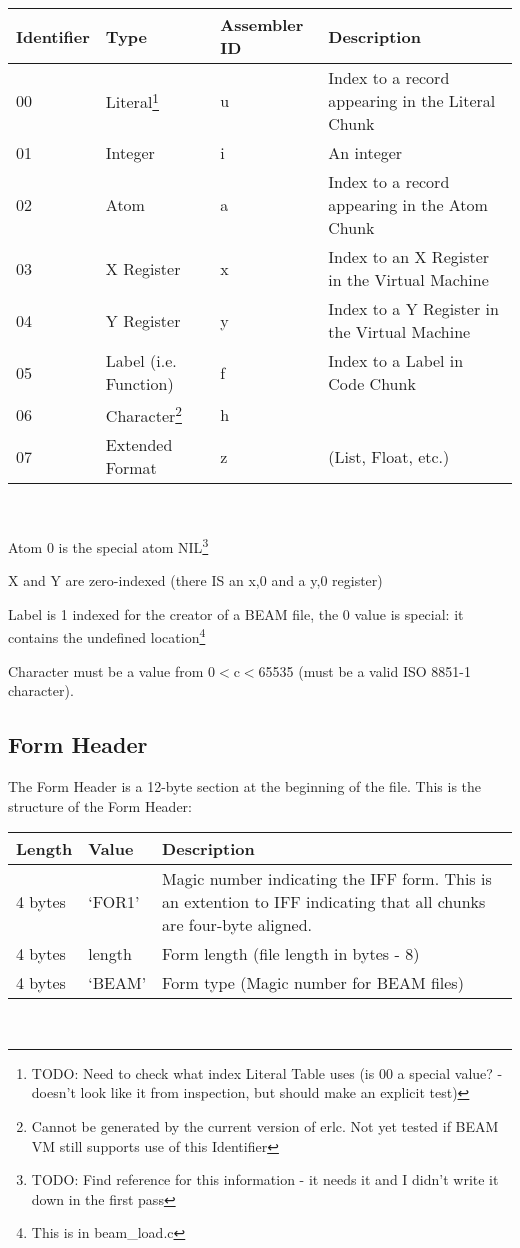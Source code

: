 \documentclass{article}
\begin{document}
\begin{savenotes}
\begin{tabular}{ |l|p{1in}|l|p{3in}| } \hline
Identifier & Type & Assembler ID & Description \\ \hline
00 & Literal\footnote{TODO: Need to check what index Literal Table uses (is 00 a special value? - doesn't look like it from inspection, but should make an explicit test)} & u & Index to a record appearing in the Literal Chunk\\ \hline
01 & Integer               & i & An integer\\ \hline
02 & Atom                  & a & Index to a record appearing in the Atom Chunk\\ \hline
03 & X Register            & x & Index to an X Register in the Virtual Machine\\ \hline
04 & Y Register            & y & Index to a Y Register in the Virtual Machine\\ \hline
05 & Label (i.e. Function) & f & Index to a Label in Code Chunk\\ \hline
06 & Character\footnote{Cannot be generated by the current version of erlc.  Not yet tested if BEAM VM still supports use of this Identifier}  & h & \\ \hline
07 & Extended Format       & z & (List, Float, etc.)\\ \hline
\end{tabular}\\
\end{savenotes}

Atom 0 is the special atom NIL\footnote{TODO: Find reference for this information
- it needs it and I didn't write it down in the first pass}

X and Y are zero-indexed (there IS an x,0 and a y,0 register)

Label is 1 indexed for the creator of a BEAM file, the 0 value is special:
it contains the undefined location\footnote{This is in beam\_load.c}

Character must be a value from 0$<$c$<$65535 (must be a valid ISO 8851-1 character).

\subsection{Form Header}
The Form Header is a 12-byte section at the beginning of the file.
This is the structure of the Form Header:\\
\begin{tabular}{ |l|l|p{3in}| } \hline
Length  & Value  & Description\\ \hline
4 bytes & `FOR1' & Magic number indicating the IFF form.  This is an extention to IFF indicating that all chunks are four-byte aligned.\\ \hline
4 bytes & length & Form length (file length in bytes - 8)\\ \hline
4 bytes & `BEAM' & Form type (Magic number for BEAM files)\\ \hline
\end{tabular}\\
\end{document}
